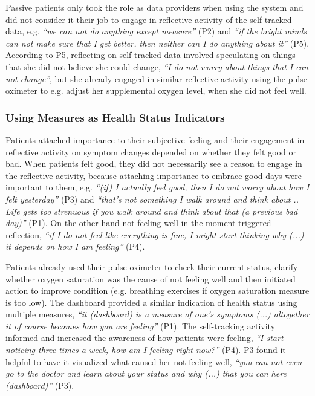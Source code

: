 Passive patients only took the role as data providers when using the system and did not consider it their job to engage in reflective activity of the self-tracked data, e.g. \textit{“we can not do anything except measure”} (P2) and \textit{“if the bright minds can not make sure that I get better, then neither can I do anything about it”} (P5). According to P5, reflecting on self-tracked data involved speculating on things that she did not believe she could change, \textit{“I do not worry about things that I can not change”}, but she already engaged in similar reflective activity using the pulse oximeter to e.g. adjust her supplemental oxygen level, when she did not feel well. 

\subsubsection{Using Measures as Health Status Indicators}
Patients attached importance to their subjective feeling and their engagement in reflective activity on symptom changes depended on whether they felt good or bad. When patients felt good, they did not necessarily see a reason to engage in the reflective activity, because attaching importance to embrace good days were important to them, e.g. \textit{“(if) I actually feel good, then I do not worry about how I felt yesterday”} (P3) and \textit{“that’s not something I walk around and think about .. Life gets too strenuous if you walk around and think about that (a previous bad day)”} (P1). On the other hand not feeling well in the moment triggered reflection, \textit{“if I do not feel like everything is fine, I might start thinking why (...) it depends on how I am feeling”} (P4). 

Patients already used their pulse oximeter to check their current status, clarify whether oxygen saturation was the cause of not feeling well and then initiated action to improve condition (e.g. breathing exercises if oxygen saturation measure is too low). The dashboard provided a similar indication of health status using multiple measures, \textit{“it (dashboard) is a measure of one’s symptoms (...) altogether it of course becomes how you are feeling”} (P1). The self-tracking activity informed and increased the awareness of how patients were feeling, \textit{“I start noticing three times a week, how am I feeling right now?”} (P4). P3 found it helpful to have it visualized what caused her not feeling well, \textit{“you can not even go to the doctor and learn about your status and why (...) that you can here (dashboard)”} (P3). 

